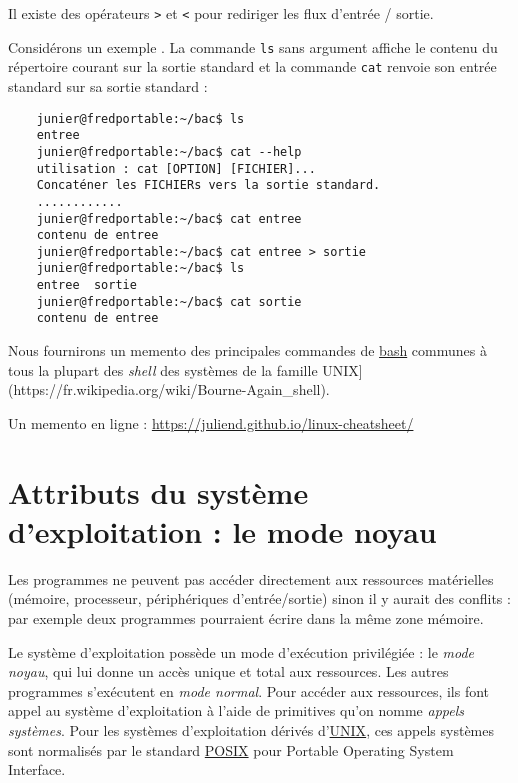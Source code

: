 \documentclass[
  11pt,
]{article}
\newcounter{prog}
\begin{document}
Il existe des opérateurs \texttt{\textgreater{}} et \texttt{\textless{}}
pour rediriger les flux d'entrée / sortie.

Considérons un exemple . La commande \texttt{ls} sans argument affiche
le contenu du répertoire courant sur la sortie standard et la commande
\texttt{cat} renvoie son entrée standard sur sa sortie standard :

\begin{verbatim}
    junier@fredportable:~/bac$ ls 
    entree
    junier@fredportable:~/bac$ cat --help 
    utilisation : cat [OPTION] [FICHIER]...
    Concaténer les FICHIERs vers la sortie standard.
    ............
    junier@fredportable:~/bac$ cat entree
    contenu de entree
    junier@fredportable:~/bac$ cat entree > sortie
    junier@fredportable:~/bac$ ls
    entree  sortie
    junier@fredportable:~/bac$ cat sortie
    contenu de entree
\end{verbatim}

Nous fournirons un memento des principales commandes de
\href{https://fr.wikipedia.org/wiki/Bourne-Again_shell}{bash} communes à
tous la plupart des \emph{shell} des systèmes de la famille
UNIX{]}(https://fr.wikipedia.org/wiki/Bourne-Again\_shell).

Un memento en ligne : \url{https://juliend.github.io/linux-cheatsheet/}

\hypertarget{attributs-du-systuxe8me-dexploitation-le-mode-noyau}{%
\section{Attributs du système d'exploitation : le mode
noyau}\label{attributs-du-systuxe8me-dexploitation-le-mode-noyau}}

Les programmes ne peuvent pas accéder directement aux ressources
matérielles (mémoire, processeur, périphériques d'entrée/sortie) sinon
il y aurait des conflits : par exemple deux programmes pourraient écrire
dans la même zone mémoire.

Le système d'exploitation possède un mode d'exécution privilégiée : le
\emph{mode noyau}, qui lui donne un accès unique et total aux
ressources. Les autres programmes s'exécutent en \emph{mode normal}.
Pour accéder aux ressources, ils font appel au système d'exploitation à
l'aide de primitives qu'on nomme \emph{appels systèmes}. Pour les
systèmes d'exploitation dérivés d'\href{}{UNIX}, ces appels systèmes
sont normalisés par le standard
\href{https://fr.wikipedia.org/wiki/POSIX}{POSIX} pour Portable
Operating System Interface.
\end{document}
